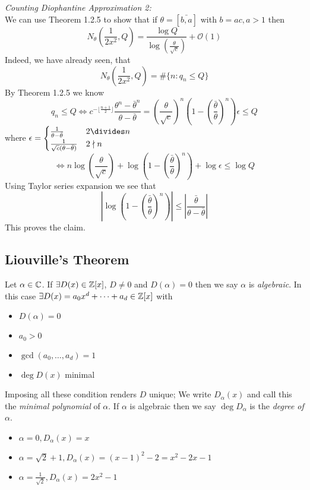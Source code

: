 \documentclass[NumTh.tex]{subfiles}
\begin{document}
\emph{Counting Diophantine Approximation 2:}\\
We can use Theorem 1.2.5 to show that if $\theta = [\bar{b,a}]$ with $b = a c, a>1$ then 
\[ N_\theta(\frac{1}{2x^2},Q) = \frac{\log Q}{\log(\frac{\theta}{\sqrt{c}})} + \mathcal{O}(1)\]
Indeed, we have already seen, that 
\[ N_\theta(\frac{1}{2x^2},Q) = \#\{n: q_n \leq Q \} \]
By Theorem 1.2.5 we know
\[ q_n \leq Q \iff c^{-\lfloor\frac{n+1}{2} \rfloor} \frac{\theta^n - \bar{\theta}^n}{\theta - \bar{\theta}} = \left(\frac{\theta}{\sqrt{c}}\right)^n \left( 1 - \left(\frac{\bar{\theta}}{\theta}\right)^n\right) \epsilon \leq Q\]
where $ \epsilon = \begin{cases} \frac{1}{\theta - \bar{\theta}} & 2 \divides n\\ \frac{1}{\sqrt{c}(\theta -\bar{\theta})} & 2 \nmid n \end{cases}$
\[ \iff n \log\left(\frac{\theta}{\sqrt{c}}\right) + \log\left( 1 - \left(\frac{\bar{\theta}}{\theta}\right)^n\right) + \log \epsilon \leq \log Q \]
Using Taylor series expansion we see that 
\[ | \log\left( 1 - \left(\frac{\bar{\theta}}{\theta} \right)^n\right) | \leq | \frac{\bar{\theta}}{\theta - \bar{\theta}} |  \]
This proves the claim.

\subsection{Liouville's Theorem}
Let $\alpha \in \mathbb{C}$. If $\exists D(x) \in \mathbb{Z}[x]$, $D \neq 0$ and $D(\alpha) = 0$ then we say $\alpha$ is \emph{algebraic}.
In this case $\exists D(x) = a_0 x^d + \dots + a_d \in \mathbb{Z}[x]$ with
\begin{itemize}
  \item $D(\alpha) = 0$
  \item $a_0 > 0$
  \item $\gcd(a_0,\dots,a_d) = 1$
  \item $\deg D(x)$ minimal
\end{itemize}
Imposing all these condition renders $D$ unique; We write $D_\alpha(x)$ and call this the \emph{minimal polynomial} of $\alpha$.
If $\alpha$ is algebraic then we say $\deg D_\alpha$ is the \emph{degree of $\alpha$}.

\begin{ex}
  \begin{itemize}
    \item $\alpha = 0, D_\alpha(x) = x$
    \item $\alpha = \sqrt{2} + 1, D_\alpha(x) = (x -1)^2 - 2 = x^2 -2x -1$
    \item $\alpha = \frac {1}{\sqrt{2}}, D_\alpha(x) = 2x^2 -1$
  \end{itemize}
\end{ex}
\end{document}
